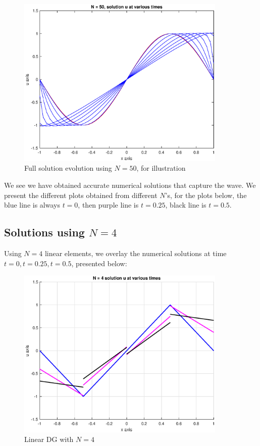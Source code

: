 \documentclass[12pt]{article} %
\newcommand{\1}[1]{\mathds{1}\left[#1\right]}
\begin{document}
\begin{figure}[t]
\includegraphics[width=10cm]{p2best.eps}
\centering
\caption{Full solution evolution using $N = 50$, for illustration}
\end{figure}

We see we have obtained accurate numerical solutions that capture the wave. We present the different plots obtained from different $N$'s, for the plots below, the blue line is always $t = 0$, then purple line is $t = 0.25$, black line is $t = 0.5$.

\subsection{Solutions using $N = 4$}
\indent \indent Using $N=4$ linear elements, we overlay the numerical solutions at time $t = 0, t = 0.25, t = 0.5$, presented below:
\newpage
\begin{figure}[t]
\includegraphics[width=10cm]{overlayn4.eps}
\centering
\caption{Linear DG with $N=4$}
\end{figure}
\newpage
\end{document}
